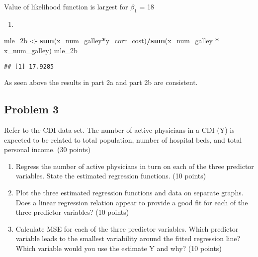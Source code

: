 \documentclass[
]{article}
\newenvironment{Shaded}{\begin{snugshade}}{\end{snugshade}}
\newcommand{\KeywordTok}[1]{\textcolor[rgb]{0.13,0.29,0.53}{\textbf{#1}}}
\newcommand{\NormalTok}[1]{#1}
\newcommand{\OperatorTok}[1]{\textcolor[rgb]{0.81,0.36,0.00}{\textbf{#1}}}
\newcommand{\StringTok}[1]{\textcolor[rgb]{0.31,0.60,0.02}{#1}}
\providecommand{\tightlist}{%
  \setlength{\itemsep}{0pt}\setlength{\parskip}{0pt}}
\begin{document}
Value of likelihood function is largest for \(\beta_1\) = 18

\begin{enumerate}
\def\labelenumi{\alph{enumi})}
\setcounter{enumi}{1}
\item
\end{enumerate}

\begin{Shaded}
\begin{Highlighting}[]
\NormalTok{mle_2b <-}\StringTok{ }\KeywordTok{sum}\NormalTok{(x_num_galley}\OperatorTok{*}\NormalTok{y_corr_cost)}\OperatorTok{/}\KeywordTok{sum}\NormalTok{(x_num_galley }\OperatorTok{*}\StringTok{ }\NormalTok{x_num_galley)}
\NormalTok{mle_2b}
\end{Highlighting}
\end{Shaded}

\begin{verbatim}
## [1] 17.9285
\end{verbatim}

As seen above the results in part 2a and part 2b are consistent.

\hypertarget{problem-3}{%
\subsection{Problem 3}\label{problem-3}}

Refer to the CDI data set. The number of active physicians in a CDI (Y)
is expected to be related to total population, number of hospital beds,
and total personal income. (30 points)

\begin{enumerate}
\def\labelenumi{\alph{enumi})}
\tightlist
\item
  Regress the number of active physicians in turn on each of the three
  predictor variables. State the estimated regression functions. (10
  points)\\
\item
  Plot the three estimated regression functions and data on separate
  graphs. Does a linear regression relation appear to provide a good fit
  for each of the three predictor variables? (10 points)\\
\item
  Calculate MSE for each of the three predictor variables. Which
  predictor variable leads to the smallest variability around the fitted
  regression line? Which variable would you use the estimate Y and why?
  (10 points)\\
\end{enumerate}
\end{document}
